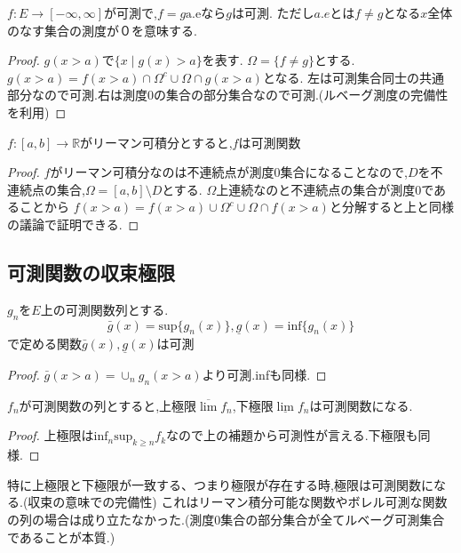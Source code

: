 \begin{prop}
 $f: E \to [- \infty, \infty]$が可測で,$f = g \mathrm{a.e}$なら$g$は可測. ただし$a.e$とは$f \neq g$となる$x$全体のなす集合の測度が０を意味する.
\end{prop}
\begin{proof}
  $g(x > a)$で$\{x \mid g(x)> a\}$を表す.
  $\Omega = \{f \neq g\}$とする.$g(x > a) = f(x > a) \cap \Omega^c \cup \Omega \cap g(x > a)$となる.
  左は可測集合同士の共通部分なので可測.右は測度0の集合の部分集合なので可測.(ルベーグ測度の完備性を利用)
\end{proof}

\begin{prop}
$f:[a,b] \to \mathbb{R}$がリーマン可積分とすると,$f$は可測関数
\end{prop}
\begin{proof}
$f$がリーマン可積分なのは不連続点が測度0集合になることなので,$D$を不連続点の集合,$\Omega = [a,b]\setminus D$とする.
$\Omega$上連続なのと不連続点の集合が測度0であることから
$f(x > a) = f(x > a) \cup \Omega^c \cup \Omega \cap f(x > a)$と分解すると上と同様の議論で証明できる.
\end{proof}
\subsection{可測関数の収束極限}

\begin{lem}
 $g_n$を$E$上の可測関数列とする.
 \begin{equation*}
  \bar{g}(x) = \mathrm{sup}\{ g_n(x)\} , \underline{g}(x)= \mathrm{inf}\{g_n(x)\}
 \end{equation*}
 で定める関数$\bar{g}(x), \underline{g}(x)$は可測
\end{lem}
\begin{proof}
$\bar{g}(x > a) = \cup_n g_n(x > a)$より可測.infも同様.
\end{proof}

\begin{thm}
 $f_n$が可測関数の列とすると,上極限$\overline{\lim} f_n$,下極限$\underline{\lim} f_n$は可測関数になる.
\end{thm}
\begin{proof}
上極限は$\mathrm{inf}_n \mathrm{sup}_{k \ge n} f_k$なので上の補題から可測性が言える.下極限も同様.
\end{proof}
\begin{rem}
 特に上極限と下極限が一致する、つまり極限が存在する時,極限は可測関数になる.(収束の意味での完備性)
 これはリーマン積分可能な関数やボレル可測な関数の列の場合は成り立たなかった.(測度0集合の部分集合が全てルベーグ可測集合であることが本質.)
\end{rem}

